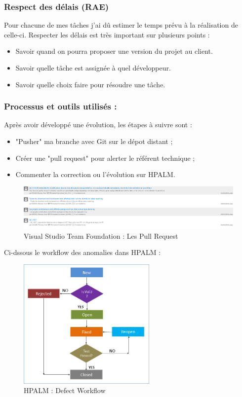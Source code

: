 \subsubsection{Respect des délais (RAE)}

Pour chacune de mes tâches j'ai dû estimer le temps prévu à la réalisation de celle-ci. Respecter les délais est très important sur plusieurs points :
\begin{itemize}
    \item Savoir quand on pourra proposer une version du projet au client.
    \item Savoir quelle tâche est assignée à quel développeur. 
    \item Savoir quelle choix faire pour résoudre une tâche.
\end{itemize}

\subsubsection{Processus et outils utilisés :}

Après avoir développé une évolution, les étapes à suivre sont :
\begin{itemize}
    \item "Pusher" ma branche avec Git sur le dépot distant ;
    \item Créer une "pull request" pour alerter le référent technique ;
    \item Commenter la correction ou l'évolution sur HPALM.
\end{itemize}

\begin{figure}[!h]
\centering
\includegraphics[width=1\textwidth]{images/PullRequest.png}
\caption{Visual Studio Team Foundation : Les Pull Request}
\end{figure}

Ci-dssous le workflow des anomalies dans HPALM :
\begin{figure}[!h]
\centering
\includegraphics[width=0.6\textwidth]{images/DefectHPALM.png}
\caption{HPALM : Defect Workflow}
\end{figure}

